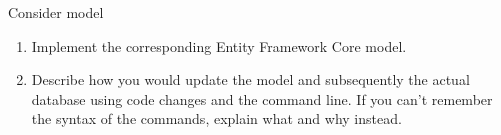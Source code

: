 Consider model

\begin{enumerate}
    \item {} Implement the corresponding Entity Framework Core model.
        
    \item {} Describe how you would update the model and subsequently the actual database using code changes and the command line. If you can’t remember the syntax of the commands, explain what and why instead. 
        \newline\answer\questionFiveAnswerB
\end{enumerate}